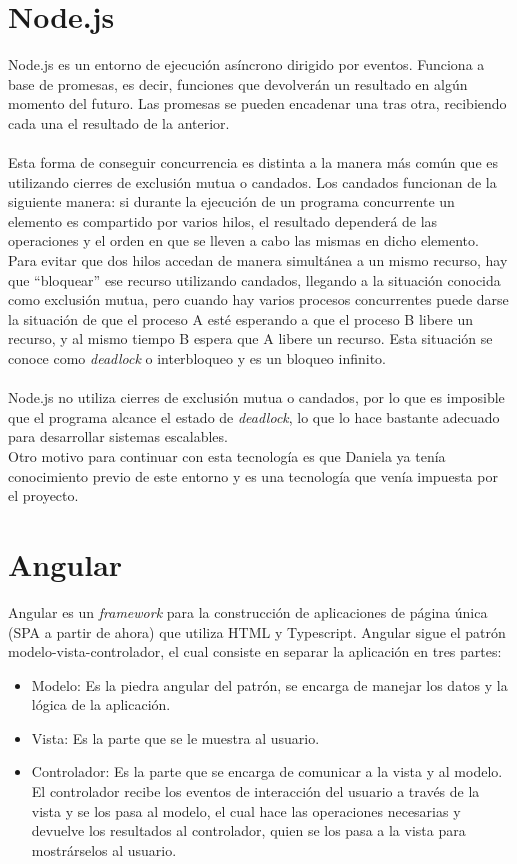 \documentclass[11pt]{book}
\begin{document}
	\section{Node.js} 
	Node.js \cite{node} es un entorno de ejecución asíncrono dirigido por eventos. Funciona a base de promesas, es decir, funciones que devolverán un resultado en algún momento del futuro. Las promesas se pueden encadenar una tras otra, recibiendo cada una el resultado de la anterior.\\\\
	Esta forma de conseguir concurrencia es distinta a la manera más común que es utilizando cierres de exclusión mutua o candados. Los candados funcionan de la siguiente manera: si durante la ejecución de un programa concurrente un elemento es compartido por varios hilos, el resultado dependerá de las operaciones y el orden en que se lleven a cabo las mismas en dicho elemento. Para evitar que dos hilos accedan de manera simultánea a un mismo recurso, hay que ``bloquear'' ese recurso utilizando candados, llegando a la situación conocida como exclusión mutua, pero cuando hay varios procesos concurrentes puede darse la situación de que el proceso A esté esperando a que el proceso B libere un recurso, y al mismo tiempo B espera que A libere un recurso. Esta situación se conoce como \emph{deadlock} o interbloqueo y es un bloqueo infinito.\\\\
	Node.js no utiliza cierres de exclusión mutua o candados, por lo que es imposible que el programa alcance el estado de \emph{deadlock}, lo que lo hace bastante adecuado para desarrollar sistemas escalables.\\
	Otro motivo para continuar con esta tecnología es que Daniela ya tenía conocimiento previo de este entorno y es una tecnología que venía impuesta por el proyecto.
	
	\section{Angular}
	Angular \cite{angular} es un \emph{framework} para la construcción de aplicaciones de página única (SPA a partir de ahora) que utiliza HTML y Typescript. Angular sigue el patrón modelo-vista-controlador, el cual consiste en separar la aplicación en tres partes:
	\begin{itemize}
		\item Modelo: Es la piedra angular del patrón, se encarga de manejar los datos y la lógica de la aplicación.
		\item Vista: Es la parte que se le muestra al usuario.
		\item Controlador: Es la parte que se encarga de comunicar a la vista y al modelo. El controlador recibe los eventos de interacción del usuario a través de la vista y se los pasa al modelo, el cual hace las operaciones necesarias y devuelve los resultados al controlador, quien se los pasa a la vista para mostrárselos al usuario.
	\end{itemize}
	
\end{document}
